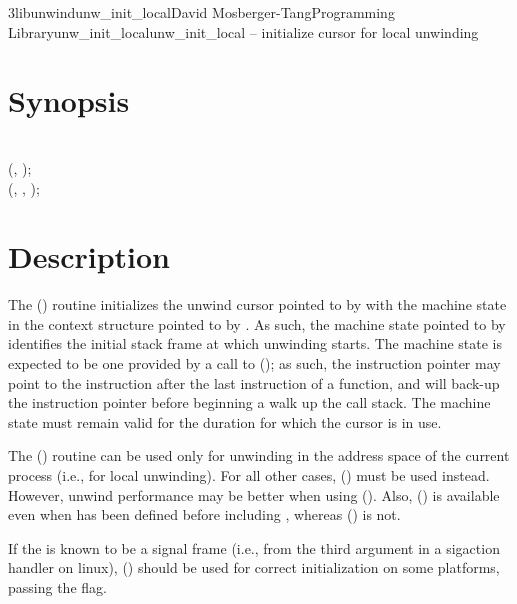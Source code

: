 \documentclass{article}
\begin{document}
\begin{Name}{3libunwind}{unw\_init\_local}{David Mosberger-Tang}{Programming Library}{unw\_init\_local}unw\_init\_local -- initialize cursor for local unwinding
\end{Name}

\section{Synopsis}

\\

 (, );\\
 (, ,  );\\

\section{Description}

The () routine initializes the unwind cursor
pointed to by  with the machine state in the context structure
pointed to by .  As such, the machine state pointed to by
 identifies the initial stack frame at which unwinding
starts.  The machine state is expected to be one provided by a call to
(); as such, the instruction pointer may point to
the instruction after the last instruction of a function, and
 will back-up the instruction pointer before beginning
a walk up the call stack.  The machine state must remain valid for the
duration for which the cursor  is in use.

The () routine can be used only for unwinding in
the address space of the current process (i.e., for local unwinding).
For all other cases, () must be used instead.
However, unwind performance may be better when using
().  Also, () is
available even when  has been defined before
including , whereas ()
is not.

If the  is known to be a signal frame (i.e.,
from the third argument in a sigaction handler on linux),
() should be used for correct initialization
on some platforms, passing the  flag.
\end{document}
